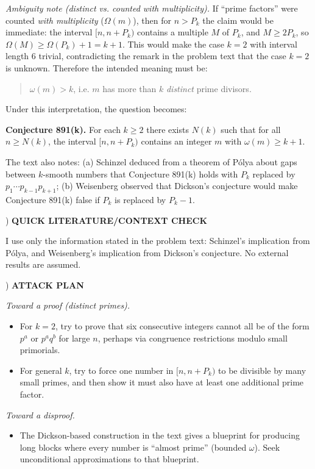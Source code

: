 \noindent \emph{Ambiguity note (distinct vs. counted with multiplicity).}
If ``prime factors'' were counted \emph{with multiplicity} ($\Omega(m)$), then for $n>P_k$ the claim would be immediate: the interval $[n,n+P_k)$ contains a multiple $M$ of $P_k$, and $M\ge 2P_k$, so $\Omega(M)\ge \Omega(P_k)+1 = k+1$. This would make the case $k=2$ with interval length $6$ trivial, contradicting the remark in the problem text that the case $k=2$ is unknown. Therefore the intended meaning must be:

\begin{quote}
$\omega(m)>k$, i.e. $m$ has more than $k$ \emph{distinct} prime divisors.
\end{quote}

\noindent Under this interpretation, the question becomes:

\noindent \textbf{Conjecture 891(k).} For each $k\ge 2$ there exists $N(k)$ such that for all $n\ge N(k)$, the interval $[n,n+P_k)$ contains an integer $m$ with $\omega(m)\ge k+1$.

\noindent The text also notes: (a) Schinzel deduced from a theorem of P\'olya about gaps between $k$-smooth numbers that Conjecture 891(k) holds with $P_k$ replaced by $p_1\cdots p_{k-1}p_{k+1}$; (b) Weisenberg observed that Dickson's conjecture would make Conjecture 891(k) false if $P_k$ is replaced by $P_k-1$.

) \textbf{QUICK LITERATURE/CONTEXT CHECK}

\noindent I use only the information stated in the problem text: Schinzel's implication from P\'olya, and Weisenberg's implication from Dickson's conjecture. No external results are assumed.

) \textbf{ATTACK PLAN}

\noindent \emph{Toward a proof (distinct primes).}
\begin{itemize}
\item For $k=2$, try to prove that six consecutive integers cannot all be of the form $p^a$ or $p^a q^b$ for large $n$, perhaps via congruence restrictions modulo small primorials.
\item For general $k$, try to force one number in $[n,n+P_k)$ to be divisible by many small primes, and then show it must also have at least one additional prime factor.
\end{itemize}
\noindent \emph{Toward a disproof.}
\begin{itemize}
\item The Dickson-based construction in the text gives a blueprint for producing long blocks where every number is ``almost prime'' (bounded $\omega$). Seek unconditional approximations to that blueprint.
\end{itemize}


